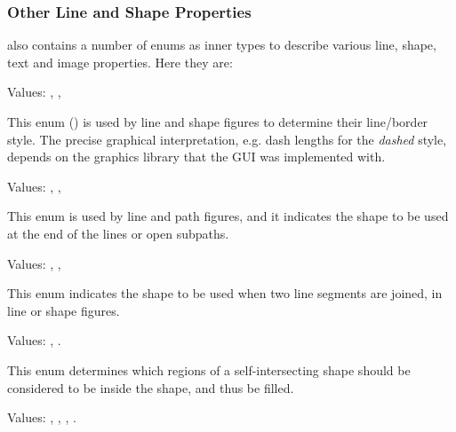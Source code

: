 \subsubsection{Other Line and Shape Properties}
\label{sec:graphics:canvas-line-and-shape-properties}

 also contains a number of enums as inner types to describe
various line, shape, text and image properties. Here they are:


Values: , , 

This enum () is used by line and shape figures
to determine their line/border style. The precise graphical interpretation,
e.g. dash lengths for the \textit{dashed} style, depends on the graphics
library that the GUI was implemented with.


Values: , , 

This enum is used by line and path figures, and it indicates the shape to
be used at the end of the lines or open subpaths.

\begin{center}
\end{center}


Values: , , 

This enum indicates the shape to be used when two line segments are joined,
in line or shape figures.

\begin{center}
\end{center}


Values: , .

This enum determines which regions of a self-intersecting shape
should be considered to be inside the shape, and thus be filled.

\begin{center}
\end{center}


Values: , , , .

